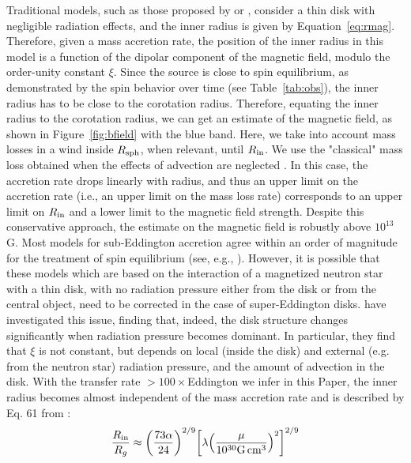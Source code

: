 \documentclass[twocolumn]{aastex631}
\newcommand{\rin}{\ensuremath{R_{\rm in}}}
\newcommand{\rsph}{\ensuremath{R_{\rm sph}}}
\newcommand{\figref}{Figure~\ref}
\newcommand{\tabref}{Table~\ref}
\begin{document}
Traditional models, such as those proposed by \citet{ghoshDiskAccretionMagnetic1978} or \citet{wangLocationInnerRadius1996}, consider a thin disk with negligible radiation effects, and the inner radius is given by Equation~\ref{eq:rmag}.
Therefore, given a mass accretion rate, the position of the inner radius in this model is a function of the dipolar component of the magnetic field, modulo the order-unity constant $\xi$.
Since the source is close to spin equilibrium, as demonstrated by the spin behavior over time (see \tabref{tab:obs}), the inner radius has to be close to the corotation radius.
Therefore, equating the inner radius to the corotation radius, we can get an estimate of the magnetic field, as shown in \figref{fig:bfield} with the blue band.
Here, we take into account mass losses in a wind inside $\rsph$, when relevant, until $\rin$.
We use the "classical" mass loss obtained when the effects of advection are neglected \citep{shakuraBlackHolesBinary1973}. In this case, the accretion rate drops linearly with radius, and thus an upper limit on the accretion rate (i.e., an upper limit on the mass loss rate) corresponds to an upper limit on $\rin$ and a lower limit to the magnetic field strength.
Despite this conservative approach, the estimate on the magnetic field is robustly above $10^{13}$\,G.
Most models for sub-Eddington accretion agree within an order of magnitude for the treatment of spin equilibrium (see, e.g., \citealt{chenStudyingMagneticFields2021}).
However, it is possible that these models which are based on the interaction of a magnetized neutron star with a thin disk, with no radiation pressure either from the disk or from the central object, need to be corrected in the case of super-Eddington disks.
\citet{chashkina2017,chashkinaSuperEddingtonAccretionDiscs2019} have investigated this issue, finding that, indeed, the disk structure changes significantly when radiation pressure becomes dominant.
In particular, they find that $\xi$ is not constant, but depends on local (inside the disk) and external (e.g. from the neutron star) radiation pressure, and the amount of advection in the disk.
With the transfer rate $>100\times$Eddington we infer in this Paper, the inner radius becomes almost independent of the mass accretion rate and is described by Eq. 61 from \citet{chashkina2017}:
\begin{equation}\label{eq:chashkina}
    \frac{\rin}{R_{g}} \approx {\left(\frac{73\alpha}{24}\right)}^{2/9}{\left[\lambda{\left(\frac{\mu}{10^{30}\mathrm{G\,cm^3}}\right)}^2\right]}^{2/9}
\end{equation}
\end{document}
